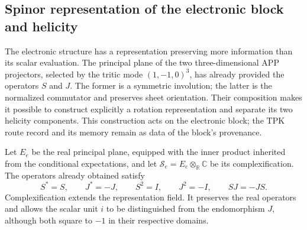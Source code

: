 \subsection{Spinor representation of the electronic block and helicity}
\label{sec:el-representacion-espinorial}

The electronic structure has a representation preserving more
information than its scalar evaluation. The principal plane of the two
three-dimensional APP projectors, selected by the tritic mode
\((1,-1,0)^3\), has already provided the operators \(S\) and \(J\).
The former is a symmetric involution; the latter is the normalized
commutator and preserves sheet orientation. Their composition makes it possible
to construct explicitly a rotation representation and separate its
two helicity components. This construction acts on the electronic
block; the TPK route record and its memory remain as data
of the block's provenance.

Let \(E_e\) be the real principal plane, equipped with the inner product inherited
from the conditional expectations, and let
\(\mathscr S_e=E_e\otimes_{\mathbb R}\mathbb C\) be its complexification.
The operators already obtained satisfy
\[
 S^*=S,\qquad J^*=-J,\qquad
 S^2=I,\qquad J^2=-I,\qquad SJ=-JS.
\]
Complexification extends the representation field. It preserves the
real operators and allows the scalar unit \(i\) to be distinguished from the
endomorphism \(J\), although both square to \(-1\) in their
respective domains.

